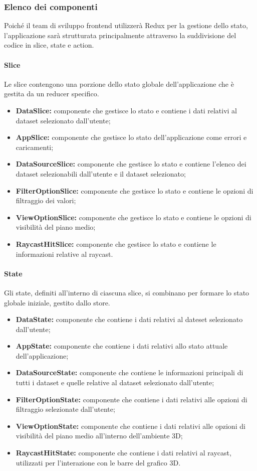 \subsubsection{Elenco dei componenti}
Poiché il team di sviluppo frontend utilizzerà Redux per la gestione dello
stato, l'applicazione sarà strutturata principalmente attraverso la
suddivisione del codice in slice, state e action.
\paragraph{Slice}
Le slice contengono una porzione dello stato globale dell'applicazione che è
gestita da un reducer specifico.
\begin{itemize}
    \item \textbf{DataSlice:} componente che gestisce lo stato e contiene i dati relativi al dataset selezionato dall'utente;
    \item \textbf{AppSlice:} componente che gestisce lo stato dell'applicazione come errori e caricamenti;
    \item \textbf{DataSourceSlice:} componente che gestisce lo stato e contiene l'elenco dei dataset selezionabili dall'utente e il dataset selezionato;
    \item \textbf{FilterOptionSlice:} componente che gestisce lo stato e contiene le opzioni di filtraggio dei valori;
    \item \textbf{ViewOptionSlice:} componente che gestisce lo stato e contiene le opzioni di visibilità del piano medio;
    \item \textbf{RaycastHitSlice:} componente che gestisce lo stato e contiene le informazioni relative al raycast.
\end{itemize}
\paragraph{State}
Gli state, definiti all'interno di ciascuna slice, si combinano per formare lo
stato globale iniziale, gestito dallo store.
\begin{itemize}
    \item \textbf{DataState:} componente che contiene i dati relativi al dateset selezionato dall'utente;
    \item \textbf{AppState:} componente che contiene i dati relativi allo stato attuale dell'applicazione;
    \item \textbf{DataSourceState:} componente che contiene le informazioni principali di tutti i dataset e quelle relative al dataset selezionato dall'utente;
    \item \textbf{FilterOptionState:} componente che contiene i dati relativi alle opzioni di filtraggio selezionate dall'utente;
    \item \textbf{ViewOptionState:} componente che contiene i dati relativi alle opzioni di visibilità del piano medio all'interno dell'ambiente 3D;
    \item \textbf{RaycastHitState:} componente che contiene i dati relativi al raycast, utilizzati per l'interazione con le barre del grafico 3D.
\end{itemize}

